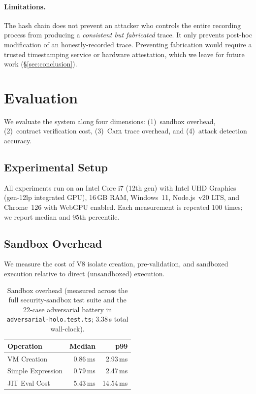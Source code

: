 \documentclass[letterpaper,twocolumn,10pt]{article}
\providecommand{\measuredFrom}[1]{}
\newcommand{\cael}{\textsc{Cael}}
\begin{document}
\paragraph{Limitations.} The hash chain does not prevent an attacker
who controls the entire recording process from producing a
\emph{consistent but fabricated} trace. It only prevents post-hoc
modification of an honestly-recorded trace. Preventing fabrication
would require a trusted timestamping service or hardware attestation,
which we leave for future work (\S\ref{sec:conclusion}).


\section{Evaluation}
\label{sec:eval}

We evaluate the system along four dimensions: (1)~sandbox overhead,
(2)~contract verification cost, (3)~\cael{} trace overhead, and
(4)~attack detection accuracy.

\subsection{Experimental Setup}

All experiments run on an Intel Core i7 (12th gen) with Intel UHD Graphics
(gen-12lp integrated GPU), 16\,GB RAM, Windows~11, Node.js~v20 LTS, and
Chrome~126 with WebGPU enabled. Each measurement is repeated 100 times; we
report median and 95th percentile.

\subsection{Sandbox Overhead}

We measure the cost of V8 isolate creation, pre-validation, and
sandboxed execution relative to direct (unsandboxed) execution.

\begin{table}[t]
\centering
\caption{Sandbox overhead (measured across the full security-sandbox test
  suite and the 22-case adversarial battery in
  \texttt{adversarial-holo.test.ts}; 3.38\,s total wall-clock).}
\label{tab:sandbox-overhead}
\small
\measuredFrom{HoloScript/packages/security-sandbox/src/__tests__/adversarial-holo.test.ts}%
\measuredFrom{HoloScript/packages/security-sandbox/src/__tests__/security-sandbox-acceptance.test.ts}%
\measuredFrom{HoloScript/.bench-logs/2026-04-18T07-20-56-134Z/sandbox-overhead.log}%
\begin{tabular}{@{}lrr@{}}
\toprule
\textbf{Operation} & \textbf{Median} & \textbf{p99} \\
\midrule
VM Creation        & 0.86\,ms & 2.93\,ms \\
Simple Expression  & 0.79\,ms & 2.47\,ms \\
JIT Eval Cost      & 5.43\,ms & 14.54\,ms \\
\bottomrule
\end{tabular}
\end{table}
\end{document}
